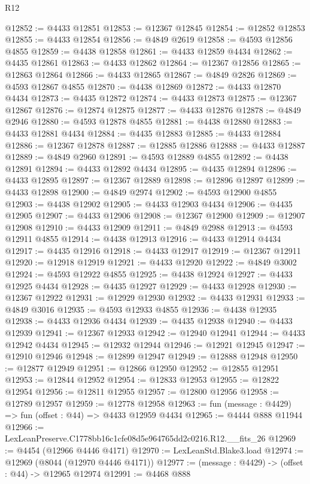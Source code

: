 \begin{lexlean}{R12}
\begin{coremodule}
@12852 := @4433 @12851
@12853 := @12367 @12845
@12854 := @12852 @12853
@12855 := @4433 @12854
@12856 := @4849 @2619
@12858 := @4593 @12856 @4855
@12859 := @4438 @12858
@12861 := @4433 @12859 @4434
@12862 := @4435 @12861
@12863 := @4433 @12862
@12864 := @12367 @12856
@12865 := @12863 @12864
@12866 := @4433 @12865
@12867 := @4849 @2826
@12869 := @4593 @12867 @4855
@12870 := @4438 @12869
@12872 := @4433 @12870 @4434
@12873 := @4435 @12872
@12874 := @4433 @12873
@12875 := @12367 @12867
@12876 := @12874 @12875
@12877 := @4433 @12876
@12878 := @4849 @2946
@12880 := @4593 @12878 @4855
@12881 := @4438 @12880
@12883 := @4433 @12881 @4434
@12884 := @4435 @12883
@12885 := @4433 @12884
@12886 := @12367 @12878
@12887 := @12885 @12886
@12888 := @4433 @12887
@12889 := @4849 @2960
@12891 := @4593 @12889 @4855
@12892 := @4438 @12891
@12894 := @4433 @12892 @4434
@12895 := @4435 @12894
@12896 := @4433 @12895
@12897 := @12367 @12889
@12898 := @12896 @12897
@12899 := @4433 @12898
@12900 := @4849 @2974
@12902 := @4593 @12900 @4855
@12903 := @4438 @12902
@12905 := @4433 @12903 @4434
@12906 := @4435 @12905
@12907 := @4433 @12906
@12908 := @12367 @12900
@12909 := @12907 @12908
@12910 := @4433 @12909
@12911 := @4849 @2988
@12913 := @4593 @12911 @4855
@12914 := @4438 @12913
@12916 := @4433 @12914 @4434
@12917 := @4435 @12916
@12918 := @4433 @12917
@12919 := @12367 @12911
@12920 := @12918 @12919
@12921 := @4433 @12920
@12922 := @4849 @3002
@12924 := @4593 @12922 @4855
@12925 := @4438 @12924
@12927 := @4433 @12925 @4434
@12928 := @4435 @12927
@12929 := @4433 @12928
@12930 := @12367 @12922
@12931 := @12929 @12930
@12932 := @4433 @12931
@12933 := @4849 @3016
@12935 := @4593 @12933 @4855
@12936 := @4438 @12935
@12938 := @4433 @12936 @4434
@12939 := @4435 @12938
@12940 := @4433 @12939
@12941 := @12367 @12933
@12942 := @12940 @12941
@12944 := @4433 @12942 @4434
@12945 := @12932 @12944
@12946 := @12921 @12945
@12947 := @12910 @12946
@12948 := @12899 @12947
@12949 := @12888 @12948
@12950 := @12877 @12949
@12951 := @12866 @12950
@12952 := @12855 @12951
@12953 := @12844 @12952
@12954 := @12833 @12953
@12955 := @12822 @12954
@12956 := @12811 @12955
@12957 := @12800 @12956
@12958 := @12789 @12957
@12959 := @12778 @12958
@12963 := fun (message : @4429) => fun (offset : @44) => @4433 @12959 @4434
@12965 := @4444 @888 @11944
@12966 := LexLeanPreserve.C1778bb16c1cfe08d5e964765dd2c0216.R12.__fits_26
@12969 := @4454 (@12966 @4446 @4171)
@12970 := LexLeanStd.Blake3.load
@12974 := @12969 (@8044 (@12970 @4446 @4171))
@12977 := (message : @4429) -> (offset : @44) -> @12965 @12974
@12991 := @4468
    @888

\end{coremodule}
\end{lexlean}
